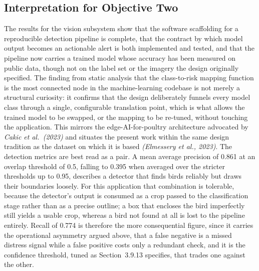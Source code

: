 \documentclass[12pt,a4paper]{report}
\begin{document}
\subsection{Interpretation for Objective Two}

The results for the vision subsystem show that the software scaffolding for a reproducible detection pipeline is complete, that the contract by which model output becomes an actionable alert is both implemented and tested, and that the pipeline now carries a trained model whose accuracy has been measured on public data, though not on the label set or the imagery the design originally specified. The finding from static analysis that the class-to-risk mapping function is the most connected node in the machine-learning codebase is not merely a structural curiosity: it confirms that the design deliberately funnels every model class through a single, configurable translation point, which is what allows the trained model to be swapped, or the mapping to be re-tuned, without touching the application. This mirrors the edge-AI-for-poultry architecture advocated by \textit{Cakic et al.\ (2023)} and situates the present work within the same design tradition as the dataset on which it is based \textit{(Elmessery et al., 2023)}. The detection metrics are best read as a pair. A mean average precision of 0.861 at an overlap threshold of 0.5, falling to 0.395 when averaged over the stricter thresholds up to 0.95, describes a detector that finds birds reliably but draws their boundaries loosely. For this application that combination is tolerable, because the detector's output is consumed as a crop passed to the classification stage rather than as a precise outline; a box that encloses the bird imperfectly still yields a usable crop, whereas a bird not found at all is lost to the pipeline entirely. Recall of 0.774 is therefore the more consequential figure, since it carries the operational asymmetry argued above, that a false negative is a missed distress signal while a false positive costs only a redundant check, and it is the confidence threshold, tuned as Section~3.9.13 specifies, that trades one against the other.
\end{document}
